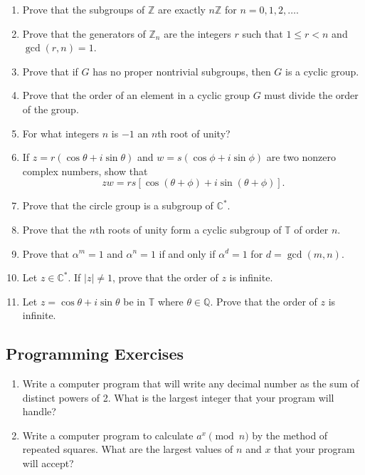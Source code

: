 {\begin{enumerate}
 
\bf\item\rm
Prove that the subgroups of ${\mathbb Z}$ are exactly $n{\mathbb Z}$ for $n
= 0, 1, 2, \ldots$. 
 
 
\bf\item\rm
Prove that the generators of ${\mathbb Z}_n$ are the integers $r$ such
that $1 \leq r < n$ and $\gcd(r,n) =  1$. 
 
 
\bf\item\rm
Prove that if $G$ has no proper nontrivial subgroups, then $G$ is a 
cyclic group.
 
 
 
\bf\item\rm
Prove that the order of an element in a cyclic group $G$ must divide
the order of the  group. 
 
 
\bf\item\rm
For what integers $n$ is $-1$ an $n$th root of unity?
 
 
\bf\item\rm
If $z = r( \cos \theta + i \sin \theta)$ and $w = s(\cos \phi + i \sin
\phi)$ are two nonzero complex numbers, show that
$$
zw = rs[ \cos( \theta + \phi)  + i \sin( \theta + \phi)].
$$
 
 
\bf\item\rm
Prove that the circle group is a subgroup of  ${\mathbb C}^*$.
 
 
\bf\item\rm
Prove that the $n$th roots of unity form a cyclic subgroup of ${\mathbb
T}$  of order $n$. 
 
 
\bf\item\rm
Prove that $\alpha^m =1$ and $\alpha^n = 1$ if and only if $\alpha^d = 1$
for $d = \gcd(m,n)$.
 
 
\bf\item\rm
Let $z \in {\mathbb C}^\ast$. If $|z| \neq 1$, prove that the order of
$z$ is infinite. 
 
 
\bf\item\rm
Let $z =\cos \theta + i \sin \theta$ be in ${\mathbb T}$ where $\theta
\in {\mathbb Q}$.  Prove that the order of $z$ is infinite.
 
\end{enumerate}
}
 
 
\subsection*{Programming Exercises}
 
 
{\small
\begin{enumerate}
 
 
\bf\item\rm
Write a computer program that will write any decimal number as the sum
of distinct powers of 2.  What is the largest integer that your
program will handle?
 
 
\bf\item\rm
Write a computer program to calculate $a^x \pmod{ n}$ by the method of
repeated squares.  What are the largest values of $n$ and $x$ that
your program will accept?  
 
 
\end{enumerate}
}
 
